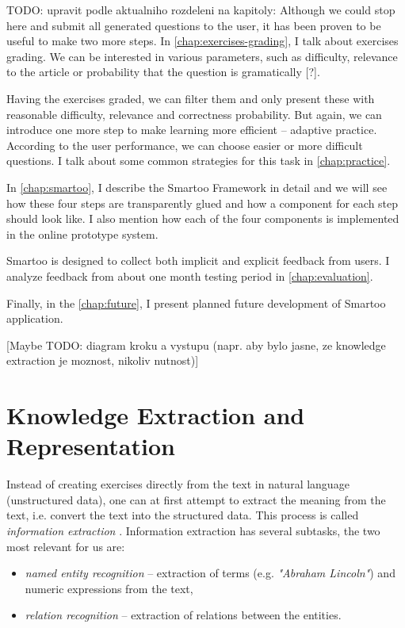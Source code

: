 \documentclass[a4paper, 12pt, twoside]{fithesis2}		%
\renewcommand{\_}{\leavevmode \kern0.07em\vbox{\hrule width0.4em}}
\newcommand{\squarebullet}{\textcolor{black}{\raisebox{0.15em}{\rule{4pt}{4pt}}}}
\newcommand{\emptysquarebullet}{\textcolor{black}{\raisebox{0.10em}{\tiny$\square$}}}
\newenvironment{myItemize}{
  \begin{itemize}[leftmargin=2em,rightmargin=1em,itemsep=\parskip ,parsep=0em,topsep=0em,partopsep=0em]
  \renewcommand{\labelitemi}{\squarebullet}
  \renewcommand{\labelitemii}{\textbullet}
}{
  \end{itemize}
}
\begin{document}
TODO: upravit podle aktualniho rozdeleni na kapitoly: Although we could stop here and submit all generated questions to the user, it has been proven to be useful to make two more steps.
In \autoref{chap:exercises-grading}, I talk about exercises grading.
We can be interested in various parameters, such as difficulty, relevance to the article or probability that the question is gramatically [?].

Having the exercises graded, we can filter them and only present these with reasonable difficulty, relevance and correctness probability.
But again, we can introduce one more step to make learning more efficient -- adaptive practice.
According to the user performance, we can choose easier or more difficult questions. I talk about some common strategies for this task in \autoref{chap:practice}.

In \autoref{chap:smartoo}, I describe the Smartoo Framework in detail
and we will see how these four steps are transparently glued and how a component for each step should look like.
I also mention how each of the four components is implemented in the online prototype system.

Smartoo is designed to collect both implicit and explicit feedback from users.
I analyze feedback from about one month testing period in \autoref{chap:evaluation}.

Finally, in the \autoref{chap:future}, I present planned future development of Smartoo application.




[Maybe TODO: diagram kroku a vystupu (napr. aby bylo jasne, ze knowledge extraction je moznost, nikoliv nutnost)]



\chapter{Knowledge Extraction and Representation}
\label{chap:knowledge}

Instead of creating exercises directly from the text in natural language (unstructured data),
one can at first attempt to extract the meaning from the text,
i.e. convert the text into the structured data.
This process is called \textit{information extraction} \cite[][262]{nlp-python}.
Information extraction has several subtasks, the two most relevant for us are:
\begin{myItemize}
  \item \textit{named entity recognition} -- extraction of terms (e.g. \textit{"Abraham Lincoln"}) and numeric expressions from the text,
\item \textit{relation recognition} -- extraction of relations between the entities.
\end{myItemize}
\end{document}
